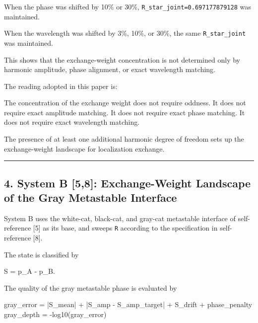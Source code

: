 \documentclass[
]{article}
\newenvironment{Shaded}{}{}
\newcommand{\NormalTok}[1]{#1}
\begin{document}
When the phase was shifted by 10\% or 30\%,
\texttt{R\_star\_joint=0.697177879128} was maintained.

When the wavelength was shifted by 3\%, 10\%, or 30\%, the same
\texttt{R\_star\_joint} was maintained.

This shows that the exchange-weight concentration is not determined only
by harmonic amplitude, phase alignment, or exact wavelength matching.

The reading adopted in this paper is:

\begin{Shaded}
\begin{Highlighting}[]
\NormalTok{The concentration of the exchange weight does not require oddness.}
\NormalTok{It does not require exact amplitude matching.}
\NormalTok{It does not require exact phase matching.}
\NormalTok{It does not require exact wavelength matching.}

\NormalTok{The presence of at least one additional harmonic degree of freedom}
\NormalTok{sets up the exchange{-}weight landscape for localization exchange.}
\end{Highlighting}
\end{Shaded}

\begin{center}\rule{0.5\linewidth}{0.5pt}\end{center}

\subsection{4. System B {[}5,8{]}: Exchange-Weight Landscape of the Gray
Metastable
Interface}\label{system-b-58-exchange-weight-landscape-of-the-gray-metastable-interface}

System B uses the white-cat, black-cat, and gray-cat metastable
interface of self-reference {[}5{]} as its base, and sweeps \texttt{R}
according to the specification in self-reference {[}8{]}.

The state is classified by

\begin{Shaded}
\begin{Highlighting}[]
\NormalTok{S = p\_A {-} p\_B.}
\end{Highlighting}
\end{Shaded}

The quality of the gray metastable phase is evaluated by

\begin{Shaded}
\begin{Highlighting}[]
\NormalTok{gray\_error = |S\_mean| + |S\_amp {-} S\_amp\_target| + S\_drift + phase\_penalty}
\NormalTok{gray\_depth = {-}log10(gray\_error)}
\end{Highlighting}
\end{Shaded}
\end{document}
